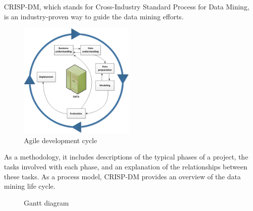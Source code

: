CRISP-DM, which stands for Cross-Industry Standard Process for Data Mining, is an industry-proven way to guide the data mining efforts.

\begin{figure}[h]
	\centering
	\includegraphics[width=0.5\textwidth]{Figures/CRISP_DM.jpg}
	\caption{Agile development cycle}
\end{figure}
\FloatBarrier

As a methodology, it includes descriptions of the typical phases of a project, the tasks involved with each phase, and an explanation of the relationships between these tasks.
As a process model, CRISP-DM provides an overview of the data mining life cycle.
\thispagestyle{empty}

\begin{landscape}
	
\begin{figure}
	\noindent
					\vspace*{-2cm}
	\hspace{4.35cm}

	\caption{Gantt diagram \label{fig:Gantt}}

\end{figure}

\end{landscape}
\restoregeometry
